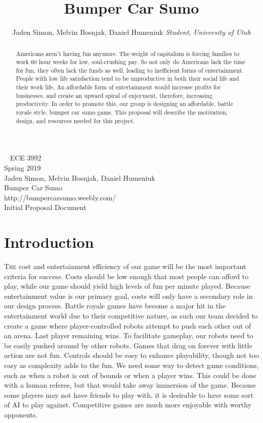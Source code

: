 \documentclass[11pt]{ieeeconf}
\title{Bumper Car Sumo}
\author{Jaden Simon, Melvin Bosnjak, Daniel Humeniuk
 \textit{Student}, \textit{University of Utah}}
\begin{document}
\begin{titlepage}
  \centering
  \
  \vfil
  \Large ECE 3992\\
  \Large Spring 2019\\  
  \Large Jaden Simon, Melvin Bosnjak, Daniel Humeniuk\\  
  \Large Bumper Car Sumo\\
  \Large http://bumpercarsumo.weebly.com/\\
  \Large Initial Proposal Document\\
  \vfil
\end{titlepage}


\maketitle
\begin{abstract}
Americans aren’t having fun anymore. The weight of capitalism is forcing families to work 60 hour weeks for low, soul-crushing pay. So not only do Americans lack the time for fun, they often lack the funds as well, leading to inefficient forms of entertainment. People with low life satisfaction tend to be unproductive in both their social life and their work life. An affordable form of entertainment would increase profits for businesses, and create an upward spiral of enjoyment, therefore, increasing productivity. In order to promote this, our group is designing an affordable, battle royale style, bumper car sumo game. This proposal will describe the motivation, design, and resources needed for this project.
\end{abstract}

\section{Introduction}
\lettrine{T}{he} cost and entertainment efficiency of our game will be the most important criteria for success. Costs should be low enough that most people can afford to play, while our game should yield high levels of fun per minute played. Because entertainment value is our primary goal, costs will only have a secondary role in our design process. Battle royale games have become a major hit in the entertainment world due to their competitive nature, as such our team decided to create a game where player-controlled robots attempt to push each other out of an arena. Last player remaining wins. To facilitate gameplay, our robots need to be easily pushed around by other robots. Games that drag on forever with little action are not fun. Controls should be easy to enhance playability, though not too easy as complexity adds to the fun. We need some way to detect game conditions, such as when a robot is out of bounds or when a player wins. This could be done with a human referee, but that would take away immersion of the game. Because some players may not have friends to play with, it is desirable to have some sort of AI to play against. Competitive games are much more enjoyable with worthy opponents.
\end{document}

